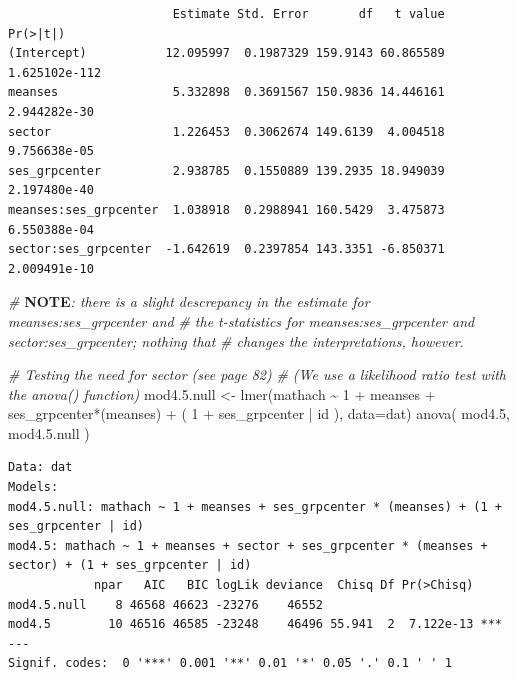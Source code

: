 \documentclass[
  letterpaper,
  DIV=11,
  numbers=noendperiod]{scrreprt}
\newenvironment{Shaded}{\begin{snugshade}}{\end{snugshade}}
\newcommand{\AlertTok}[1]{\textcolor[rgb]{1.00,0.00,0.00}{\textbf{#1}}}
\newcommand{\AttributeTok}[1]{\textcolor[rgb]{0.49,0.56,0.16}{#1}}
\newcommand{\CommentTok}[1]{\textcolor[rgb]{0.38,0.63,0.69}{\textit{#1}}}
\newcommand{\DecValTok}[1]{\textcolor[rgb]{0.25,0.63,0.44}{#1}}
\newcommand{\FloatTok}[1]{\textcolor[rgb]{0.25,0.63,0.44}{#1}}
\newcommand{\FunctionTok}[1]{\textcolor[rgb]{0.02,0.16,0.49}{#1}}
\newcommand{\NormalTok}[1]{\textcolor[rgb]{0.00,0.44,0.13}{#1}}
\newcommand{\OtherTok}[1]{\textcolor[rgb]{0.00,0.44,0.13}{#1}}
\newcommand{\SpecialCharTok}[1]{\textcolor[rgb]{0.25,0.44,0.63}{#1}}
\begin{document}
\begin{verbatim}
                       Estimate Std. Error       df   t value      Pr(>|t|)
(Intercept)           12.095997  0.1987329 159.9143 60.865589 1.625102e-112
meanses                5.332898  0.3691567 150.9836 14.446161  2.944282e-30
sector                 1.226453  0.3062674 149.6139  4.004518  9.756638e-05
ses_grpcenter          2.938785  0.1550889 139.2935 18.949039  2.197480e-40
meanses:ses_grpcenter  1.038918  0.2988941 160.5429  3.475873  6.550388e-04
sector:ses_grpcenter  -1.642619  0.2397854 143.3351 -6.850371  2.009491e-10
\end{verbatim}

\begin{Shaded}
\begin{Highlighting}[]
\CommentTok{\# }\AlertTok{NOTE}\CommentTok{: there is a slight descrepancy in the estimate for meanses:ses\_grpcenter and }
\CommentTok{\# the t{-}statistics for meanses:ses\_grpcenter and sector:ses\_grpcenter; nothing that }
\CommentTok{\# changes the interpretations, however.}


\CommentTok{\# Testing the need for sector  (see page 82)}
\CommentTok{\# (We use a likelihood ratio test with the anova() function)}
\NormalTok{mod4.}\FloatTok{5.}\NormalTok{null }\OtherTok{\textless{}{-}} \FunctionTok{lmer}\NormalTok{(mathach }\SpecialCharTok{\textasciitilde{}} \DecValTok{1} \SpecialCharTok{+}\NormalTok{ meanses }\SpecialCharTok{+}\NormalTok{ ses\_grpcenter}\SpecialCharTok{*}\NormalTok{(meanses) }\SpecialCharTok{+}\NormalTok{ ( }\DecValTok{1} \SpecialCharTok{+}\NormalTok{ ses\_grpcenter }\SpecialCharTok{|}\NormalTok{ id ), }\AttributeTok{data=}\NormalTok{dat)}
\FunctionTok{anova}\NormalTok{( mod4}\FloatTok{.5}\NormalTok{, mod4.}\FloatTok{5.}\NormalTok{null )}
\end{Highlighting}
\end{Shaded}

\begin{verbatim}
Data: dat
Models:
mod4.5.null: mathach ~ 1 + meanses + ses_grpcenter * (meanses) + (1 + ses_grpcenter | id)
mod4.5: mathach ~ 1 + meanses + sector + ses_grpcenter * (meanses + sector) + (1 + ses_grpcenter | id)
            npar   AIC   BIC logLik deviance  Chisq Df Pr(>Chisq)    
mod4.5.null    8 46568 46623 -23276    46552                         
mod4.5        10 46516 46585 -23248    46496 55.941  2  7.122e-13 ***
---
Signif. codes:  0 '***' 0.001 '**' 0.01 '*' 0.05 '.' 0.1 ' ' 1
\end{verbatim}
\end{document}
